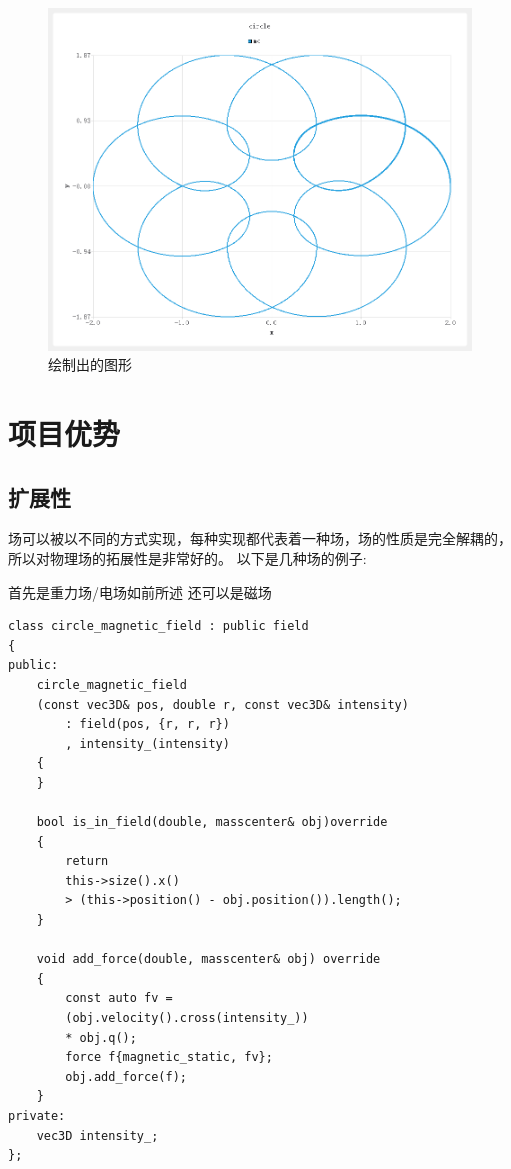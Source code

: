 \begin{figure} [hb]
    \centering 
    \includegraphics[width=.75\textwidth]{result1.png}
\caption{绘制出的图形} 
\end{figure}

\chapter{项目优势}
\section{扩展性}
场可以被以不同的方式实现，每种实现都代表着一种场，场的性质是完全解耦的，所以对物理场的拓展性是非常好的。
以下是几种场的例子:

\noindent 首先是重力场/电场如前所述
\noindent 还可以是磁场
{\setmainfont{Consolas}
\begin{lstlisting}
class circle_magnetic_field : public field
{
public:
    circle_magnetic_field
    (const vec3D& pos, double r, const vec3D& intensity)
        : field(pos, {r, r, r})
        , intensity_(intensity)
	{
	}

	bool is_in_field(double, masscenter& obj)override
	{
        return 
        this->size().x() 
        > (this->position() - obj.position()).length();
	}

	void add_force(double, masscenter& obj) override
	{
        const auto fv =
        (obj.velocity().cross(intensity_)) 
        * obj.q();
		force f{magnetic_static, fv};
		obj.add_force(f);
	}
private:
	vec3D intensity_;
};
\end{lstlisting}
}

